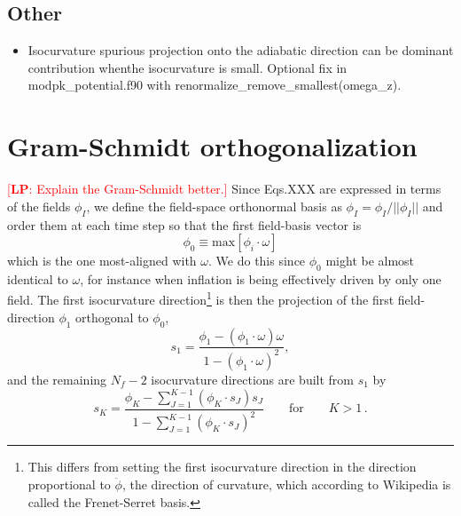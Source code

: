 \documentclass[11pt]{article}
\newcommand{\lp}[1]{\textcolor{red}{[{\bf LP}: #1]}}
\begin{document}
\subsection{Other}

\begin{itemize}

  \item Isocurvature spurious projection onto the adiabatic direction can be dominant contribution whenthe isocurvature is small.  Optional fix in modpk\_potential.f90 with renormalize\_remove\_smallest(omega\_z).


\end{itemize}


\section{Gram-Schmidt orthogonalization}
\label{sect:gsorthog}

\lp{Explain the Gram-Schmidt better.}
  Since Eqs.XXX are expressed in terms of the fields $\phi_I$, we define the field-space orthonormal basis as $\phi_I = \phi_I/||\phi_I||$ and order them at each time step so that the first field-basis vector is 
\begin{equation}
  \phi_0 \equiv \mathrm{max} [\phi_i \cdot \omega ]
  \label{eqn:XXX}
\end{equation}
which is the one most-aligned with $\omega$.  We do this since $\phi_0$ might be almost identical to $\omega$, for instance when inflation is being effectively driven by only one field.  The first isocurvature direction\footnote{This differs from setting the first isocurvature direction in the direction proportional to $\ddot \phi$, the direction of curvature, which according to Wikipedia is called the Frenet-Serret basis.}
is then the projection of the first field-direction $\phi_1$ orthogonal to $\phi_0$,
\begin{equation}
  s_1 = \frac{\phi_1 - ( \phi_1 \cdot \omega ) \omega}{1-(\phi_1 \cdot \omega)^2},
  \label{eqn:s1_gs}
\end{equation}
and the remaining $N_f-2$ isocurvature directions are built from $s_1$ by
\begin{equation}
   s_K = \frac{  \phi_K - \sum_{J=1}^{K-1} (  \phi_K \cdot  s_J )  s_J}{1-\sum_{J=1}^{K-1} (  \phi_K \cdot  s_J )^2} \qquad \mathrm{for} \qquad K>1 \, .
  \label{eqn:sk_gs}
\end{equation}
\end{document}
